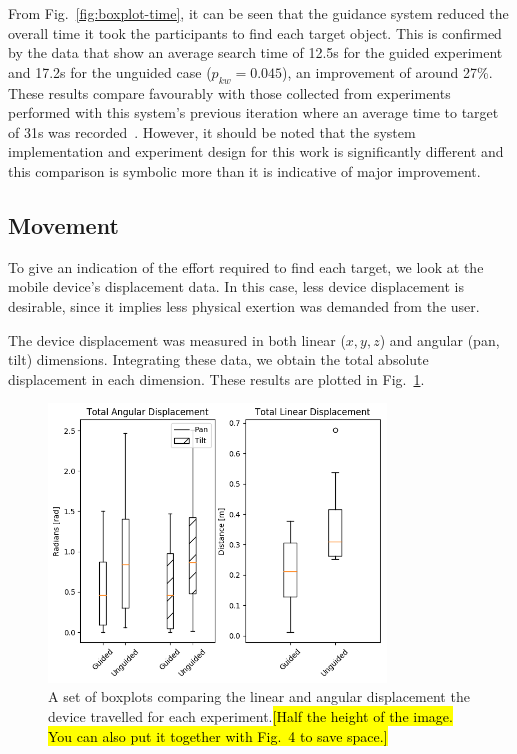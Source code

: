\documentclass[runningheads]{llncs}
\DeclareRobustCommand{\tofix}[1]{{\sethlcolor{yellow}\hl{[#1]}}}
\begin{document}
From Fig.~\ref{fig:boxplot-time}, it can be seen that the guidance system reduced the overall time it took the participants to find each target object.
This is confirmed by the data that show an average search time of 12.5s for the guided experiment and 17.2s for the unguided case ($p_{kw}=0.045$), an improvement of around 27\%.
These results compare favourably with those collected from experiments performed with this system's previous iteration where an average time to target of 31s was recorded~\cite{lock2019active}. 
However, it should be noted that the system implementation and experiment design for this work is significantly different and this comparison is symbolic more than it is indicative of major improvement.

\subsection{Movement}

To give an indication of the effort required to find each target, we look at the mobile device's displacement data. 
In this case, less device displacement is desirable, since it implies less physical exertion was demanded from the user.

The device displacement was measured in both linear ($x, y, z$) and angular (pan, tilt) dimensions.
Integrating these data, we obtain the total absolute displacement in each dimension.
These results are plotted in Fig.~\ref{fig:boxplot-displacement}.

\begin{figure}[t]
  \centering
  \includegraphics[width=0.8\textwidth]{figures/boxplot_displacement.png}
  \caption{A set of boxplots comparing the linear and angular displacement the device travelled for each experiment.\tofix{Half the height of the image. You can also put it together with Fig.~4 to save space.}}\label{fig:boxplot-displacement}
\end{figure}
\end{document}
